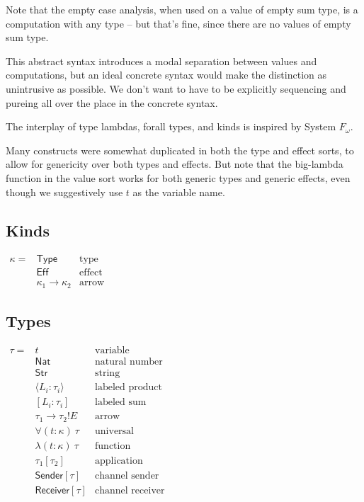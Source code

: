 \documentclass[12pt]{article}
\begin{document}
Note that the empty case analysis, when used on a value of empty sum type, is a
computation with any type -- but that's fine, since there are no values of empty
sum type.

This abstract syntax introduces a modal separation between values and
computations, but an ideal concrete syntax would make the distinction as
unintrusive as possible. We don't want to have to be explicitly sequencing and
\textsf{pure}ing all over the place in the concrete syntax.

The interplay of type lambdas, forall types, and kinds is inspired by System
$F_\omega$.

Many constructs were somewhat duplicated in both the type and effect sorts, to
allow for genericity over both types and effects. But note that the big-lambda
function in the value sort works for both generic types and generic effects,
even though we suggestively use $t$ as the variable name.

\subsection{Kinds}

$\begin{array}{lll}
\kappa =
  & \textsf{Type}                 & \text{type} \\
  & \textsf{Eff}                  & \text{effect} \\
  & \kappa_1 \rightarrow \kappa_2 & \text{arrow}
\end{array}$

\subsection{Types}

$\begin{array}{lll}
\tau =
  & t                            & \text{variable} \\
  & \textsf{Nat}                 & \text{natural number} \\
  & \textsf{Str}                 & \text{string} \\
  & \langle L_i : \tau_i \rangle & \text{labeled product} \\
  & [ L_i : \tau_i ]             & \text{labeled sum} \\
  & \tau_1 \rightarrow \tau_2!E  & \text{arrow} \\
  & \forall (t : \kappa) \ \tau  & \text{universal} \\
  & \lambda (t : \kappa) \ \tau  & \text{function} \\
  & \tau_1[\tau_2]               & \text{application} \\
  & \textsf{Sender}[\tau]        & \text{channel sender} \\
  & \textsf{Receiver}[\tau]      & \text{channel receiver}
\end{array}$
\end{document}
